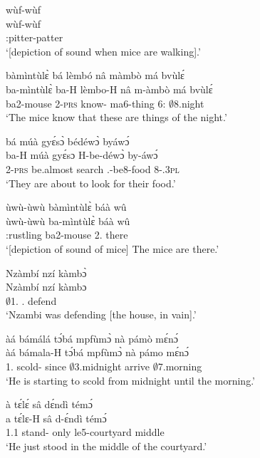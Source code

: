 \begin{exe}[(N234)]
\exN\label{n194} 
  \glll wùf-wùf \\
        wùf-wùf \\
        {\IDEO}:pitter-patter \\
    \trans `[depiction of sound when mice are walking].'
 
\exN\label{n195}
  \glll bàmìntùlɛ̀ bá lèmbó nâ màmbò má bvùlɛ́ \\
        ba-mìntùlɛ̀ ba-H lèmbo-H nâ m-àmbò má bvùlɛ́ \\
     ba2-mouse 2-\textsc{prs} know-{\R} {\COMP} ma6-thing 6:{\ATT}  $\emptyset$8.night    \\
    \trans `The mice know that these are things of the night.'
 
\exN\label{n196} 
  \glll bá múà gyɛ́sɔ̀ bédéwɔ̀ byáwɔ́ \\
         ba-H múà gyɛ́sɔ H-be-déwɔ̀ by-áwɔ́ \\
      2-\textsc{prs} be.almost search {\OBJ}.{\LINK}-be8-food 8-{\POSS}.3\textsc{pl}  \\
    \trans `They are about to look for their food.'
 
\exN\label{n197}
  \glll ùwù-ùwù bàmìntùlɛ̀ báà wû \\
        ùwù-ùwù ba-mìntùlɛ̀ báà wû \\
        {\IDEO}:rustling ba2-mouse 2.{\COP} there \\
    \trans `[depiction of sound of mice] The mice are there.'
 
\exN\label{n198}
  \glll Nzàmbí nzí kàmbɔ̀ \\
        Nzàmbí nzí kàmbɔ \\
        $\emptyset$1.{\PN} {\PROG}.{\PST}  defend \\
    \trans `Nzambi was defending [the house, in vain].'
 
\exN\label{n199}
  \glll àá bámálá tɔ́bá mpfùmɔ̀ nà pámò mɛ́nɔ́ \\
       àá bámala-H tɔ́bá mpfùmɔ̀ nà pámo mɛ́nɔ́ \\
       1.{\INCH} scold-{\R} since  $\emptyset$3.midnight {\CONJ} arrive $\emptyset$7.morning \\
    \trans `He is starting to scold from midnight until the morning.'
 
\exN\label{n200} 
  \glll à tɛ́lɛ́ sâ dɛ́ndì témɔ́ \\
         a tɛ́lɛ-H sâ d-ɛ́ndì témɔ́ \\
        1.{\PST}1 stand-{\R} only le5-courtyard middle \\
    \trans `He just stood in the middle of the courtyard.'
 

\end{exe}
